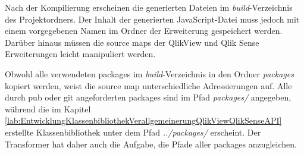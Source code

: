 Nach der Kompilierung erscheinen die generierten Dateien im \textit{build}-Verzeichnis des Projektordners. Der Inhalt der generierten JavaScript-Datei muss jedoch mit einem vorgegebenen Namen im Ordner der Erweiterung gespeichert werden. Darüber hinaus müssen die source maps der QlikView und Qlik Sense Erweiterungen leicht manipuliert werden.

Obwohl alle verwendeten packages im \textit{build}-Verzeichnis in den Ordner \textit{packages} kopiert werden, weist die source map unterschiedliche Adressierungen auf. Alle durch pub oder git angeforderten packages sind im Pfad \textit{packages/} angegeben, während die im Kapitel \ref{lab:EntwicklungKlassenbibliothekVerallgemeinerungQlikViewQlikSenseAPI} erstellte Klassen\-bibliothek unter dem Pfad \textit{../packages/} erscheint. Der Transformer hat daher auch die Aufgabe, die Pfade aller packages anzugleichen.

